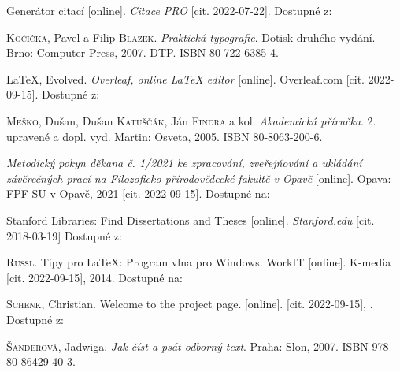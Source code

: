 \begin{thebibliography}{99}
Generátor citací [online]. \emph{Citace PRO} [cit. 2022-07-22]. Dostupné z: 

\textsc{Kočička}, Pavel a Filip \textsc{Blažek}. \emph{Praktická typografie}. Dotisk druhého vydání. Brno: Computer Press, 2007. DTP. ISBN 80-722-6385-4.


\LaTeX, Evolved. \emph{Overleaf, online \LaTeX{} editor} [online]. Overleaf.com [cit. 2022-09-15]. Dostupné z: 


\textsc{Meško}, Dušan, Dušan \textsc{Katuščák}, Ján \textsc{Findra} a kol. \emph{Akademická příručka}. 2. upravené a dopl. vyd. Martin: Osveta, 2005. ISBN 80-8063-200-6.

\emph{Metodický pokyn děkana č. 1/2021 ke zpracování, zveřejňování a ukládání závěrečných prací na Filozoficko-přírodovědecké fakultě v Opavě} [online]. Opava: FPF SU v Opavě, 2021 [cit. 2022-09-15]. Dostupné na: 

Stanford Libraries: Find Dissertations and Theses [online]. \emph{Stanford.edu} [cit. 2018-03-19] Dostupné z: 


\textsc{Russl}. Tipy pro LaTeX: Program vlna pro Windows. WorkIT [online]. K-media [cit. 2022-09-15], 2014. Dostupné na:

\textsc{Schenk}, Christian. Welcome to the \MikTeX{} project page. \MikTeX{} [online]. [cit. 2022-09-15], . Dostupné z: 

\textsc{Šanderová}, Jadwiga. \emph{Jak číst a psát odborný text}. Praha: Slon, 2007. ISBN 978-80-86429-40-3.



\end{thebibliography}



